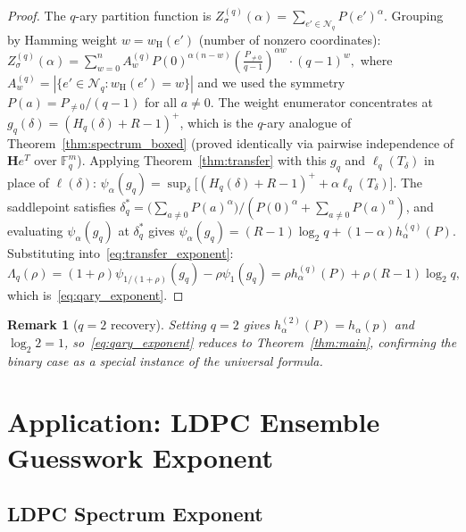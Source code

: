 \documentclass[journal,10pt,onecolumn]{IEEEtran}
\newtheorem{remark}{Remark}
\newcommand{\wH}{w_{\mathrm{H}}}
\newcommand{\Hm}{\mathbf{H}}
\begin{document}
\begin{proof}
The $q$-ary partition function is
$Z_\sigma^{(q)}(\alpha)=\sum_{e'\in\mathcal{N}_q}P(e')^\alpha$.
Grouping by Hamming weight $w=\wH(e')$ (number of nonzero
coordinates):
\(
    Z_\sigma^{(q)}(\alpha)
    =\sum_{w=0}^n A_w^{(q)}P(0)^{\alpha(n-w)}
    \left(\tfrac{P_{\ne 0}}{q-1}\right)^{\!\alpha w}
    \cdot(q-1)^w,
\)
where $A_w^{(q)}=|\{e'\in\mathcal{N}_q:\wH(e')=w\}|$ and we
used the symmetry $P(a)=P_{\ne 0}/(q-1)$ for all $a\ne 0$.
The weight enumerator concentrates at
$g_q(\delta)=(H_q(\delta)+R-1)^+$, which is the $q$-ary
analogue of Theorem~\ref{thm:spectrum_boxed} (proved identically
via pairwise independence of $\Hm e^T$ over $\mathbb{F}_q^m$).
Applying Theorem~\ref{thm:transfer} with this $g_q$ and
$\ell_q(T_\delta)$ in place of $\ell(\delta)$:
\(
    \psi_\alpha(g_q)
    =\sup_\delta\bigl[(H_q(\delta)+R-1)^+
    +\alpha\ell_q(T_\delta)\bigr].
\)
The saddlepoint satisfies
$\delta_q^*=\bigl(\sum_{a\ne 0}P(a)^\alpha\bigr)
/(P(0)^\alpha+\sum_{a\ne 0}P(a)^\alpha)$,
and evaluating $\psi_\alpha(g_q)$ at $\delta_q^*$ gives
$\psi_\alpha(g_q)=(R-1)\log_2 q+(1-\alpha)h^{(q)}_\alpha(P)$.
Substituting into~\eqref{eq:transfer_exponent}:
\(
    \Lambda_q(\rho)
    =(1+\rho)\psi_{1/(1+\rho)}(g_q)-\rho\psi_1(g_q)
    =\rho h^{(q)}_\alpha(P)+\rho(R-1)\log_2 q,
\)
which is~\eqref{eq:qary_exponent}.
\end{proof}

\begin{remark}[$q=2$ recovery]
Setting $q=2$ gives $h^{(2)}_\alpha(P)=h_\alpha(p)$ and
$\log_2 2=1$, so~\eqref{eq:qary_exponent} reduces to
Theorem~\ref{thm:main}, confirming the binary case as a
special instance of the universal formula.
\end{remark}



\section{Application: LDPC Ensemble Guesswork Exponent}
\label{sec:structured}


\subsection{LDPC Spectrum Exponent}
\label{subsec:ldpc_spectrum}
\end{document}
